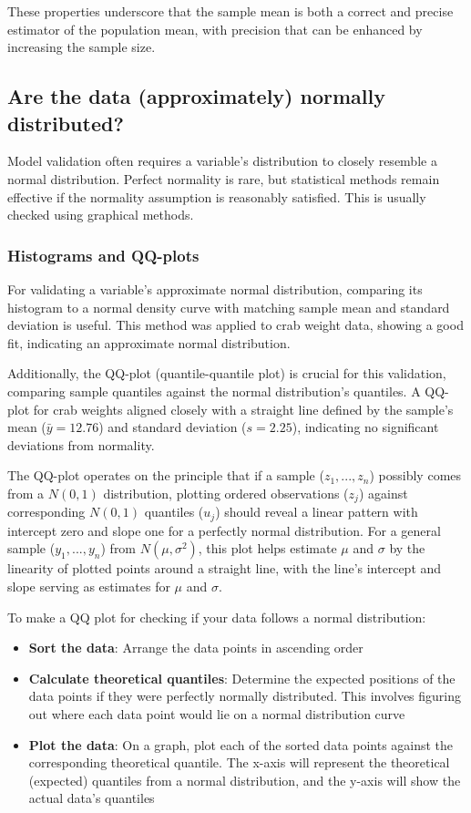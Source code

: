 \documentclass{article}
\begin{document}
These properties underscore that the sample mean is both a correct and precise estimator of the population mean, with precision that can be enhanced by increasing the sample size.

\subsection{Are the data (approximately) normally distributed?}

Model validation often requires a variable's distribution to closely resemble a normal distribution. Perfect normality is rare, but statistical methods remain effective if the normality assumption is reasonably satisfied. This is usually checked using graphical methods.

\subsubsection{Histograms and QQ-plots}

For validating a variable's approximate normal distribution, comparing its histogram to a normal density curve with matching sample mean and standard deviation is useful. This method was applied to crab weight data, showing a good fit, indicating an approximate normal distribution.

Additionally, the QQ-plot (quantile-quantile plot) is crucial for this validation, comparing sample quantiles against the normal distribution's quantiles. A QQ-plot for crab weights aligned closely with a straight line defined by the sample's mean ($\bar y = 12.76$) and standard deviation ($s =2.25$), indicating no significant deviations from normality.

The QQ-plot operates on the principle that if a sample ($z_1,...,z_n$) possibly comes from a $N(0,1)$ distribution, plotting ordered observations ($z_{j}$) against corresponding $N(0,1)$ quantiles ($u_j$) should reveal a linear pattern with intercept zero and slope one for a perfectly normal distribution. For a general sample ($y_1,...,y_n$) from $N(\mu, \sigma^2)$, this plot helps estimate $\mu$ and $\sigma$ by the linearity of plotted points around a straight line, with the line's intercept and slope serving as estimates for $\mu$ and $\sigma$.

To make a QQ plot for checking if your data follows a normal distribution:

\begin{itemize}
    \item \textbf{Sort the data}: Arrange the data points in ascending order
    \item \textbf{Calculate theoretical quantiles}: Determine the expected positions of the data points if they were perfectly normally distributed. This involves figuring out where each data point would lie on a normal distribution curve
    \item \textbf{Plot the data}: On a graph, plot each of the sorted data points against the corresponding theoretical quantile. The x-axis will represent the theoretical (expected) quantiles from a normal distribution, and the y-axis will show the actual data's quantiles
\end{itemize}
\end{document}
